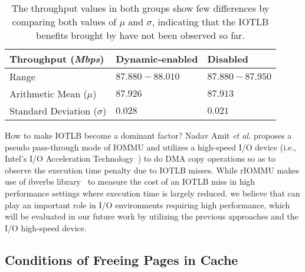 \begin{table}[!ht]
\footnotesize
\begin{center}
\begin{tabular}{|l|l|l|}
\hline
{\textbf{Throughput (\emph{Mbps})}} & {\textbf{Dynamic-enabled}} & {\textbf{Disabled}}    \\ \hline
Range & $87.880-88.010$ & $87.880-87.950$ \\ \hline
Arithmetic Mean ($\mu$)  &  $87.926$ & $87.913$ \\ \hline
Standard Deviation ($\sigma$) &  $0.028$ & $0.021$ \\ \hline
\end{tabular}
\end{center}
\caption{The throughput values in both groups show few differences by comparing both values of $\mu$ and $\sigma$, indicating that the IOTLB benefits brought by \name have not been observed so far.}
\label{tab:netperf}
\end{table}

How to make IOTLB become a dominant factor? Nadav Amit \emph{et al.} proposes a pseudo pass-through mode of IOMMU and utilizes a high-speed I/O device (i.e., Intel’s I/O Acceleration Technology~\cite{lauritzenintel}) to do DMA copy operations so as to observe the execution time penalty due to IOTLB misses. While rIOMMU makes use of ibverbs library~\cite{ibverbsevaluation,kerr2011dissecting} to measure the cost of an IOTLB miss in high performance settings where execution time is largely reduced.
we believe that \name can play an important role in I/O environments requiring high performance, which will be evaluated in our future work by utilizing the previous approaches and the I/O high-speed device.

\subsection{Conditions of Freeing Pages in Cache}

